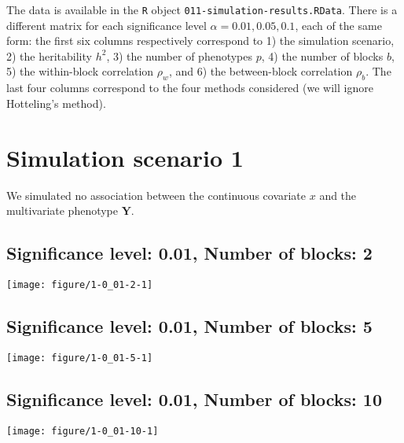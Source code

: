 \documentclass[11pt,letter]{article}\usepackage[]{graphicx}\usepackage[]{color}
\makeatletter
\def\maxwidth{ %
  \ifdim\Gin@nat@width>\linewidth
    \linewidth
  \else
    \Gin@nat@width
  \fi
}
\newenvironment{knitrout}{}{} %
\makeatother
\begin{document}
The data is available in the \texttt{R} object \texttt{011-simulation-results.RData}. There is a different matrix for each significance level $\alpha=0.01, 0.05, 0.1$, each of the same form: the first six columns respectively correspond to 1) the simulation scenario, 2) the heritability $h^2$, 3) the number of phenotypes $p$, 4) the number of blocks $b$, 5) the within-block correlation $\rho_w$, and 6) the between-block correlation $\rho_b$. The last four columns correspond to the four methods considered (we will ignore Hotteling's method).

\newpage

\section{Simulation scenario 1}

We simulated no association between the continuous covariate $x$ and the multivariate phenotype $\mathbf{Y}$.

\newpage




\subsection{Significance level: 0.01, Number of blocks: 2}

\begin{knitrout}
\color{fgcolor}
\texttt{[image: figure/1-0\_01-2-1]} 

\end{knitrout}

\newpage
\subsection{Significance level: 0.01, Number of blocks: 5}

\begin{knitrout}
\color{fgcolor}
\texttt{[image: figure/1-0\_01-5-1]} 

\end{knitrout}

\newpage
\subsection{Significance level: 0.01, Number of blocks: 10}

\begin{knitrout}
\color{fgcolor}
\texttt{[image: figure/1-0\_01-10-1]} 

\end{knitrout}
\end{document}
